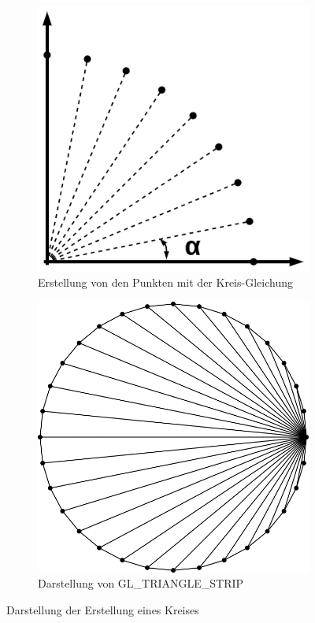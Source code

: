\documentclass[doktyp=studarbeit]{TUBAFarbeiten}
\begin{document}
\begin{figure}[!h]
    \centering
    \begin{subfigure}[b]{0.4\textwidth}
        \centering
        \includegraphics[width=0.8\linewidth]{kreis-1.png}
        \caption{Erstellung von den Punkten mit der Kreis-Gleichung}
    \end{subfigure}
    \begin{subfigure}[b]{0.4\textwidth}
        \centering
        \includegraphics[width=0.8\linewidth]{kreis-2.png}
        \caption{Darstellung von GL\_TRIANGLE\_STRIP}
    \end{subfigure}
    \caption{Darstellung der Erstellung eines Kreises}
    \label{fig:player}
\end{figure}
\end{document}
